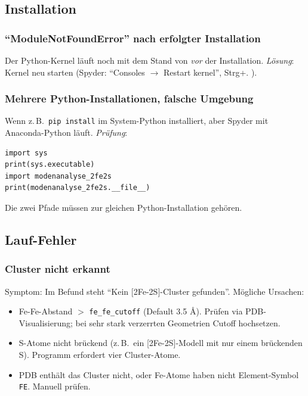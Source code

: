 \documentclass[11pt,a4paper,twoside]{article}
\theoremstyle{remark}
\begin{document}
\subsection{Installation}

\subsubsection*{``ModuleNotFoundError'' nach erfolgter Installation}

Der Python-Kernel l\"auft noch mit dem Stand von \emph{vor} der
Installation. \emph{L\"osung}: Kernel neu starten (Spyder:
``Consoles $\to$ Restart kernel'', Strg+. ).

\subsubsection*{Mehrere Python-Installationen, falsche Umgebung}

Wenn z.\,B.\ \texttt{pip install} im System-Python installiert, aber
Spyder mit Anaconda-Python l\"auft. \emph{Pr\"ufung}:

\begin{lstlisting}[style=python]
import sys
print(sys.executable)
import modenanalyse_2fe2s
print(modenanalyse_2fe2s.__file__)
\end{lstlisting}

Die zwei Pfade m\"ussen zur gleichen Python-Installation geh\"oren.

\subsection{Lauf-Fehler}

\subsubsection*{Cluster nicht erkannt}

Symptom: Im Befund steht ``Kein {[}2Fe-2S{]}-Cluster gefunden''. M\"ogliche
Ursachen:

\begin{itemize}
  \item Fe-Fe-Abstand $>$ \texttt{fe\_fe\_cutoff} (Default 3.5 \AA{}).
        Pr\"ufen via PDB-Visualisierung; bei sehr stark verzerrten
        Geometrien Cutoff hochsetzen.
  \item S-Atome nicht br\"uckend (z.\,B.\ ein {[}2Fe-2S{]}-Modell mit
        nur einem br\"uckenden S). Programm erfordert vier Cluster-Atome.
  \item PDB enth\"alt das Cluster nicht, oder Fe-Atome haben nicht
        Element-Symbol \texttt{FE}. Manuell pr\"ufen.
\end{itemize}
\end{document}
